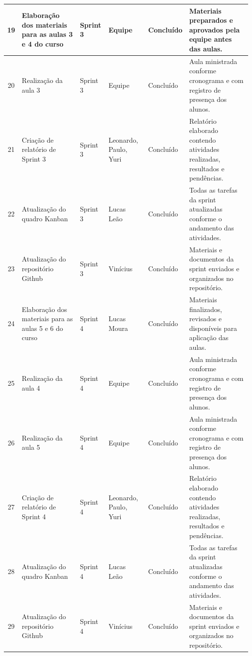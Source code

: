 \documentclass[12pt,a4paper]{article}
\begin{document}
\begin{longtable}{|c|p{3.8cm}|p{1.9cm}|p{2.2cm}|p{1.7cm}|p{4.2cm}|}
19 & Elaboração dos materiais para as aulas 3 e 4 do curso & Sprint 3 & Equipe & Concluído & Materiais preparados e aprovados pela equipe antes das aulas. \\ \hline

20 & Realização da aula 3 & Sprint 3 & Equipe & Concluído & Aula ministrada conforme cronograma e com registro de presença dos alunos. \\ \hline

21 & Criação de relatório de Sprint 3 & Sprint 3 & Leonardo, Paulo, Yuri & Concluído & Relatório elaborado contendo atividades realizadas, resultados e pendências. \\ \hline

22 & Atualização do quadro Kanban & Sprint 3 & Lucas Leão & Concluído & Todas as tarefas da sprint atualizadas conforme o andamento das atividades. \\ \hline

23 & Atualização do repositório Github & Sprint 3 & Vinícius & Concluído & Materiais e documentos da sprint enviados e organizados no repositório. \\ \hline

24 & Elaboração dos materiais para as aulas 5 e 6 do curso & Sprint 4 & Lucas Moura & Concluído & Materiais finalizados, revisados e disponíveis para aplicação das aulas. \\ \hline

25 & Realização da aula 4 & Sprint 4 & Equipe & Concluído & Aula ministrada conforme cronograma e com registro de presença dos alunos. \\ \hline

26 & Realização da aula 5 & Sprint 4 & Equipe & Concluído & Aula ministrada conforme cronograma e com registro de presença dos alunos. \\ \hline

27 & Criação de relatório de Sprint 4 & Sprint 4 & Leonardo, Paulo, Yuri & Concluído & Relatório elaborado contendo atividades realizadas, resultados e pendências. \\ \hline

28 & Atualização do quadro Kanban & Sprint 4 & Lucas Leão & Concluído & Todas as tarefas da sprint atualizadas conforme o andamento das atividades. \\ \hline

29 & Atualização do repositório Github & Sprint 4 & Vinícius & Concluído & Materiais e documentos da sprint enviados e organizados no repositório. \\ \hline


\end{longtable}
\end{document}

